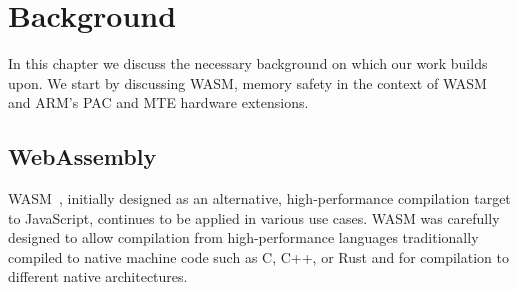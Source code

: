 \chapter{Background}
\label{ch:background}

In this chapter we discuss the necessary background on which our work builds upon.
We start by discussing \ac{WASM}, memory safety in the context of \ac{WASM} and ARM's \ac{PAC} and \ac{MTE} hardware extensions.


\section{WebAssembly}
\label{sec:wasm}

\Acl{WASM}~\cite{haas2017bringing}, initially designed as an alternative, high-performance compilation target to JavaScript, continues to be applied in various use cases.
\Ac{WASM} was carefully designed to allow compilation from high-performance languages traditionally compiled to native machine code such as C, C++, or Rust and for compilation to different native architectures.
